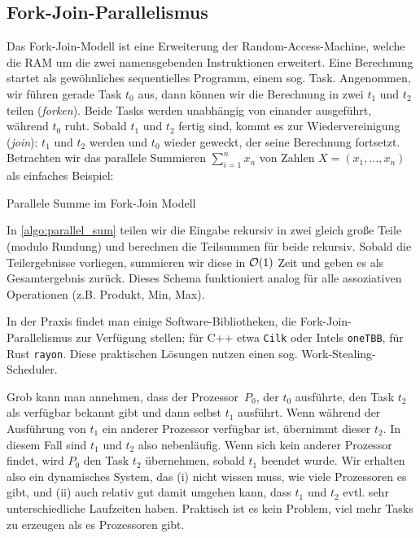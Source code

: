 \subsection{Fork-Join-Parallelismus}
Das Fork-Join-Modell ist eine Erweiterung der Random-Access-Machine, welche die RAM um die zwei namensgebenden Instruktionen erweitert.
Eine Berechnung startet als gewöhnliches sequentielles Programm, einem sog. Task.
Angenommen, wir führen gerade Task $t_0$ aus, dann können wir die Berechnung in zwei  $t_1$ und $t_2$ tei\-len  (\emph{forken}).
Beide Tasks werden unabhängig von einander ausgeführt, während $t_0$ ruht.
Sobald $t_1$ und $t_2$ fertig sind, kommt es zur Wiedervereinigung  (\emph{join}):
$t_1$ und $t_2$ werden  und $t_0$ wieder geweckt, der seine Berechnung fortsetzt.
Betrachten wir das parallele Summieren $\sum_{i=1}^n x_n$ von Zahlen $X = (x_1, \ldots, x_n)$ als einfaches Beispiel:

\begin{algorithm}
    \caption{Parallele Summe im Fork-Join Modell}
    \label{algo:parallel_sum}
\end{algorithm}

In \cref{algo:parallel_sum} teilen wir die Eingabe rekursiv in zwei gleich große Teile (modulo Rundung) und berechnen die Teilsummen für beide rekursiv.
Sobald die Teilergebnisse vorliegen, summieren wir diese in $\mathcal{O}\!\left(1\right)$ Zeit und geben es als Gesamtergebnis zurück.
Dieses Schema funktioniert analog für alle assoziativen Operationen (z.B. Produkt, Min, Max).

In der Praxis findet man einige Software-Bibliotheken, die Fork-Join-Parallelismus zur Verfügung stellen;
für C++ etwa \texttt{Cilk} oder Intels \texttt{oneTBB}, für Rust \texttt{rayon}.
Diese praktischen Lösungen nutzen einen sog. Work-Stealing-Scheduler.

Grob  kann man annehmen, dass der Prozessor~$P_0$, der $t_0$ ausführte, den Task $t_2$ als verfügbar bekannt gibt und dann selbst $t_1$ ausführt.
Wenn während der Ausführung von $t_1$ ein anderer Prozessor verfügbar ist, übernimmt dieser $t_2$.
In diesem Fall sind $t_1$ und $t_2$ also nebenläufig.
Wenn sich kein anderer Prozessor findet, wird $P_0$ den Task $t_2$ übernehmen, sobald $t_1$ beendet wurde.
Wir erhalten also ein dynamisches System, das (i) nicht wissen muss, wie viele Prozessoren es gibt, und (ii) auch relativ gut damit umgehen kann, dass $t_1$ und $t_2$ evtl. sehr unterschiedliche Laufzeiten haben.
Praktisch ist es kein Problem, viel mehr Tasks zu erzeugen als es Prozessoren gibt.

